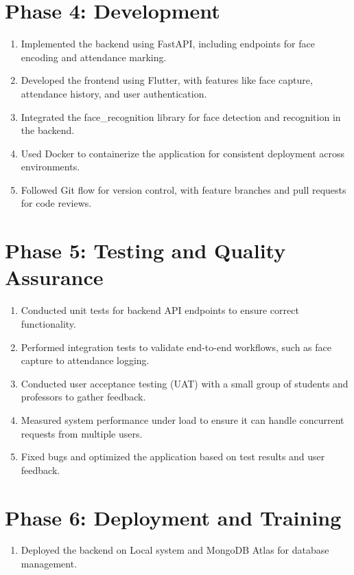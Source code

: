 \documentclass[openany]{report}
\begin{document}
\section{Phase 4: Development}

\begin{enumerate}
    \item Implemented the backend using FastAPI, including endpoints for face encoding and attendance marking.
    \item Developed the frontend using Flutter, with features like face capture, attendance history, and user authentication.
    \item Integrated the face\_recognition library for face detection and recognition in the backend.
    \item Used Docker to containerize the application for consistent deployment across environments.
    \item Followed Git flow for version control, with feature branches and pull requests for code reviews.
\end{enumerate}

\section{Phase 5: Testing and Quality Assurance}

\begin{enumerate}
    \item Conducted unit tests for backend API endpoints to ensure correct functionality.
    \item Performed integration tests to validate end-to-end workflows, such as face capture to attendance logging.
    \item Conducted user acceptance testing (UAT) with a small group of students and professors to gather feedback.
    \item Measured system performance under load to ensure it can handle concurrent requests from multiple users.
    \item Fixed bugs and optimized the application based on test results and user feedback.
\end{enumerate}

\section{Phase 6: Deployment and Training}

\begin{enumerate}
    \item Deployed the backend on Local system and MongoDB Atlas for database management.
\end{enumerate}
\end{document}

